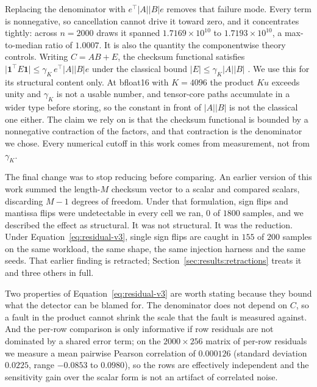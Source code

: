 Replacing the denominator with $e^{\!\top} \lvert A \rvert \lvert B \rvert e$
removes that failure mode. Every term is nonnegative, so cancellation cannot
drive it toward zero, and it concentrates tightly: across $n = 2000$ draws it
spanned $1.7169 \times 10^{10}$ to $1.7193 \times 10^{10}$, a max-to-median
ratio of $1.0007$. It is also the quantity the componentwise theory controls.
Writing $C = AB + E$, the checksum functional satisfies
$\lvert \mathbf{1}^{\!\top} E \mathbf{1} \rvert \leq
\gamma_K \, e^{\!\top} \lvert A \rvert \lvert B \rvert e$ under the classical
bound $\lvert E \rvert \leq \gamma_K \lvert A \rvert \lvert B \rvert$
\citep{higham2002accuracy}. We use this for its structural content only.
At bfloat16 with $K = 4096$ the product $Ku$ exceeds unity and $\gamma_K$ is
not a usable number, and tensor-core paths accumulate in a wider type before
storing, so the constant in front of $\lvert A \rvert \lvert B \rvert$ is not
the classical one either. The claim we rely on is that the checksum functional
is bounded by a nonnegative contraction of the factors, and that contraction
is the denominator we chose. Every numerical cutoff in this work comes from
measurement, not from $\gamma_K$.

The final change was to stop reducing before comparing. An earlier version of
this work summed the length-$M$ checksum vector to a scalar and compared
scalars, discarding $M-1$ degrees of freedom. Under that formulation, sign
flips and mantissa flips were undetectable in every cell we ran, $0$ of $1800$
samples, and we described the effect as structural. It was not structural. It
was the reduction. Under Equation~\ref{eq:residual-v3}, single sign flips are
caught in $155$ of $200$ samples on the same workload, the same shape, the
same injection harness and the same seeds. That earlier finding is retracted;
Section~\ref{sec:results:retractions} treats it and three others in full.

Two properties of Equation~\ref{eq:residual-v3} are worth stating because they
bound what the detector can be blamed for. The denominator does not depend on
$C$, so a fault in the product cannot shrink the scale that the fault is
measured against. And the per-row comparison is only informative if row
residuals are not dominated by a shared error term; on the $2000 \times 256$
matrix of per-row residuals we measure a mean pairwise Pearson correlation of
$0.000126$ (standard deviation $0.0225$, range $-0.0853$ to $0.0980$), so the
rows are effectively independent and the sensitivity gain over the scalar form
is not an artifact of correlated noise.

